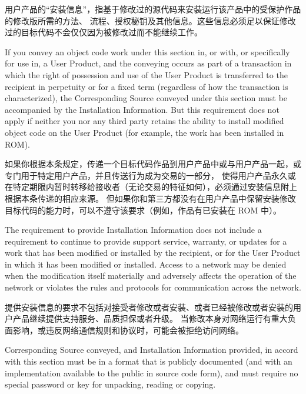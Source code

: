\documentclass[11pt]{article}
\begin{document}
\begin{enumerate}
        用户产品的“安装信息”，指基于修改过的源代码来安装运行该产品中的受保护作品的修改版所需的方法、
        流程、授权秘钥及其他信息。这些信息必须足以保证修改过的目标代码不会仅仅因为被修改过而不能继续工作。

        If you convey an object code work under this section in, or with, or
        specifically for use in, a User Product, and the conveying occurs as
        part of a transaction in which the right of possession and use of the
        User Product is transferred to the recipient in perpetuity or for a
        fixed term (regardless of how the transaction is characterized), the
        Corresponding Source conveyed under this section must be accompanied
        by the Installation Information.  But this requirement does not apply
        if neither you nor any third party retains the ability to install
        modified object code on the User Product (for example, the work has
        been installed in ROM).

        如果你根据本条规定，传递一个目标代码作品到用户产品中或与用户产品一起，或专门用于特定用户产品，并且传送行为成为交易的一部分，
        使得用户产品永久或在特定期限内暂时转移给接收者（无论交易的特征如何），必须通过安装信息附上根据本条传递的相应来源。
        但如果你和第三方都没有在用户产品中保留安装修改目标代码的能力时，可以不遵守该要求（例如，作品有已安装在 ROM 中）。

        The requirement to provide Installation Information does not include a
        requirement to continue to provide support service, warranty, or updates
        for a work that has been modified or installed by the recipient, or for
        the User Product in which it has been modified or installed.  Access to a
        network may be denied when the modification itself materially and
        adversely affects the operation of the network or violates the rules and
        protocols for communication across the network.

        提供安装信息的要求不包括对接受者修改或者安装、或者已经被修改或者安装的用户产品继续提供支持服务、品质担保或者升级。
        当修改本身对网络运行有重大负面影响，或违反网络通信规则和协议时，可能会被拒绝访问网络。

        Corresponding Source conveyed, and Installation Information provided,
        in accord with this section must be in a format that is publicly
        documented (and with an implementation available to the public in
        source code form), and must require no special password or key for
        unpacking, reading or copying.


\end{enumerate}
\end{document}
